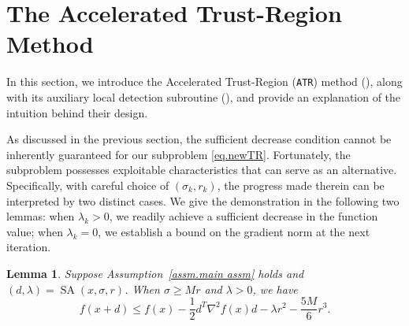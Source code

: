 \documentclass{article}
\theoremstyle{plain}
\newtheorem{lemma}[theorem]{Lemma}
\theoremstyle{definition}
\theoremstyle{remark}
\begin{document}

\section{The Accelerated Trust-Region Method}\label{sec.method}
In this section, we introduce the Accelerated Trust-Region (\texttt{ATR}) method (), along with its auxiliary local detection subroutine (), and provide an explanation of the intuition behind their design.


As discussed in the previous section, the sufficient decrease condition cannot be inherently guaranteed for our subproblem \eqref{eq.newTR}. Fortunately, the subproblem possesses exploitable characteristics that can serve as an alternative. Specifically, with careful choice of $(\sigma_k,r_k)$, the progress made therein can be interpreted by two distinct cases. We give the demonstration in the following two lemmas: when $\lambda_k>0$, we readily achieve a sufficient decrease in the function value; when $\lambda_k = 0$, we establish a bound on the gradient norm at the next iteration.

\begin{lemma}
    \label{lem.function decrease}
    Suppose Assumption~\ref{assm.main assm} holds and $(d,\lambda) = \operatorname{SA}(x,\sigma,r)$. When $\sigma \geq M r$ and $\lambda>0$, we have
    \begin{equation}
        \label{eq.function decrease advanced}
        f(x+d) \leq f(x)-\frac{1}{2}d^T \nabla^2 f(x) d-\lambda r^2 -\frac{5M}{6} r^3.
    \end{equation}
\end{lemma}
\end{document}
